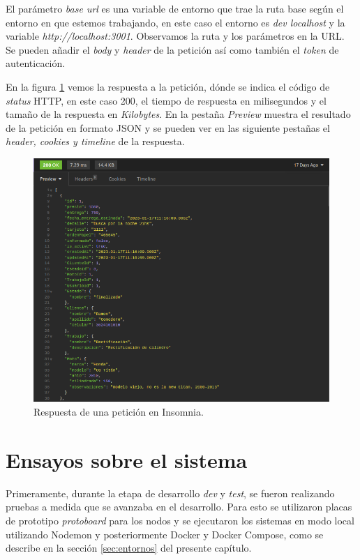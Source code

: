 El parámetro \textit{base url} es una variable de entorno que trae la ruta base según el entorno en que estemos trabajando, en este caso el entorno es \textit{dev localhost} y la variable \textit{http://localhost:3001}. Observamos la ruta y los parámetros en la URL. Se pueden añadir el \textit{body} y \textit{header} de la petición así como también el \textit{token} de autenticación.

En la figura \ref{fig:insomnia-request-2} vemos la respuesta a la petición, dónde se indica el código de \textit{status} HTTP, en este caso 200, el tiempo de respuesta en milisegundos y el tamaño de la respuesta en \textit{Kilobytes}. En la pestaña \textit{Preview} muestra el resultado de la petición en formato JSON y se pueden ver en las siguiente pestañas el \textit{header, cookies y timeline} de la respuesta. 

\begin{figure}[H]
	\centering
	\includegraphics[scale=.45]{./Figures/insomnia-request-2.png}
	\caption{Respuesta de una petición en Insomnia.}
	\label{fig:insomnia-request-2}
\end{figure}


\section{Ensayos sobre el sistema}
\label{sec:ensayos-nodos}

Primeramente, durante la etapa de desarrollo \textit{dev} y \textit{test}, se fueron realizando pruebas a medida que se avanzaba en el desarrollo. Para esto se utilizaron placas de prototipo \textit{protoboard} para los nodos y se ejecutaron los sistemas en modo local utilizando Nodemon y posteriormente Docker y Docker Compose, como se describe en la sección \ref{sec:entornos} del presente capítulo.

